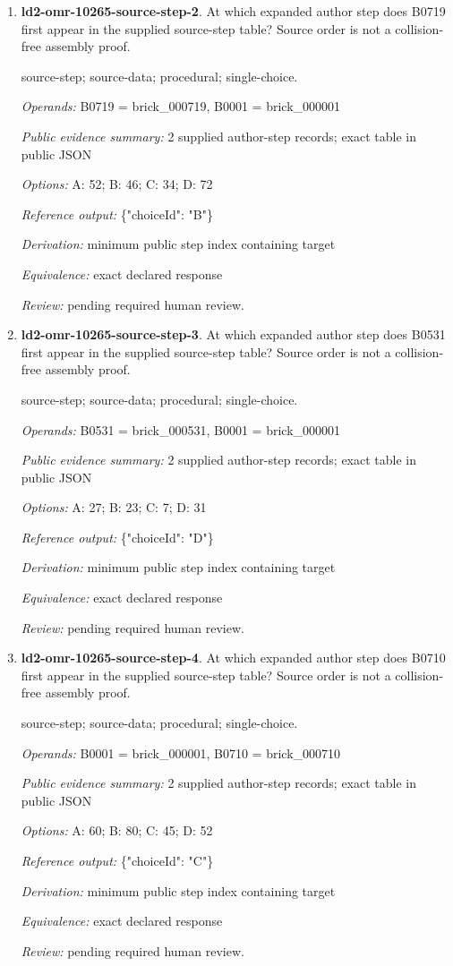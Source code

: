 \begin{enumerate}
\item \textbf{ld2-omr-10265-source-step-2}. At which expanded author step does B0719 first appear in the supplied source-step table? Source order is not a collision-free assembly proof.
\par{\small source-step; source-data; procedural; single-choice.\par\textit{Operands:} B0719 = brick\_000719, B0001 = brick\_000001\par\textit{Public evidence summary:} 2 supplied author-step records; exact table in public JSON\par\textit{Options:} A: 52; B: 46; C: 34; D: 72\par\textit{Reference output:} \{"choiceId": "B"\}\par\textit{Derivation:} minimum public step index containing target\par\textit{Equivalence:} exact declared response\par\textit{Review:} pending required human review.}
\item \textbf{ld2-omr-10265-source-step-3}. At which expanded author step does B0531 first appear in the supplied source-step table? Source order is not a collision-free assembly proof.
\par{\small source-step; source-data; procedural; single-choice.\par\textit{Operands:} B0531 = brick\_000531, B0001 = brick\_000001\par\textit{Public evidence summary:} 2 supplied author-step records; exact table in public JSON\par\textit{Options:} A: 27; B: 23; C: 7; D: 31\par\textit{Reference output:} \{"choiceId": "D"\}\par\textit{Derivation:} minimum public step index containing target\par\textit{Equivalence:} exact declared response\par\textit{Review:} pending required human review.}
\item \textbf{ld2-omr-10265-source-step-4}. At which expanded author step does B0710 first appear in the supplied source-step table? Source order is not a collision-free assembly proof.
\par{\small source-step; source-data; procedural; single-choice.\par\textit{Operands:} B0001 = brick\_000001, B0710 = brick\_000710\par\textit{Public evidence summary:} 2 supplied author-step records; exact table in public JSON\par\textit{Options:} A: 60; B: 80; C: 45; D: 52\par\textit{Reference output:} \{"choiceId": "C"\}\par\textit{Derivation:} minimum public step index containing target\par\textit{Equivalence:} exact declared response\par\textit{Review:} pending required human review.}

\end{enumerate}
